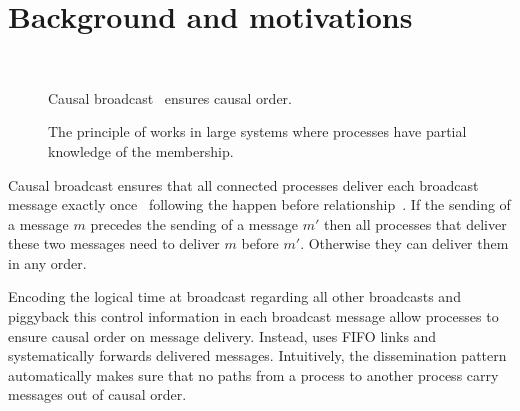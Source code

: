 
\section{Background and motivations}
\label{sec:motivations}

\begin{figure*}
  \begin{center}
    \hspace{40pt}
    \hspace{40pt}
    \\
    \hspace{40pt}
    \caption{\label{fig:generalsolve}Causal broadcast~\cite{friedman2004causal}
      ensures causal order.}
  \end{center}
\end{figure*}


\begin{figure}
  \begin{center}
    
    \caption{\label{fig:disseminationtree}The principle of
      \cite{friedman2004causal} works in large systems where processes have
      partial knowledge of the membership.}
  \end{center}
\end{figure}

Causal broadcast ensures that all connected processes deliver each broadcast
message exactly once~\cite{hadzilacos1994modular} following the happen before
relationship~\cite{lamport1978time}. If the sending of a message $m$ precedes
the sending of a message $m'$ then all processes that deliver these two messages
need to deliver $m$ before $m'$. Otherwise they can deliver them in any order.

Encoding the logical time at broadcast regarding all other broadcasts and
piggyback this control information in each broadcast message allow processes to
ensure causal order on message delivery. Instead, \cite{friedman2004causal}
uses FIFO links and systematically forwards delivered messages.  Intuitively,
the dissemination pattern automatically makes sure that no paths from a process
to another process carry messages out of causal order.

